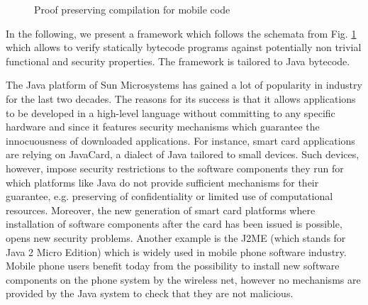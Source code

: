  

    \begin{figure}[ht!]
\begin{center}
\caption{\sc Proof preserving compilation for mobile code}
\label{intro:PPO}
\end{center}
\end{figure}


In the following, we present a framework which follows the schemata from Fig. \ref{intro:PPO}  which allows to verify statically bytecode programs 
against potentially non trivial functional and security properties. The framework is tailored to Java bytecode.

  The Java platform  of Sun Microsystems has gained a lot of popularity in industry  for the last two decades.
 The reasons for its  success is that it allows applications to 
 be developed in a high-level language without committing to any
 specific hardware and since it features security mechanisms which
 guarantee the innocuousness of downloaded applications.  
 For instance, smart card applications are relying  on JavaCard, a dialect of Java tailored to small devices.
 Such devices, however, impose  security restrictions  to the software components  they run for which platforms like Java do not provide 
 sufficient mechanisms for their guarantee, e.g. preserving of confidentiality or limited use of computational resources. Moreover,
 the new generation of smart card platforms where installation of  software components after the card has been issued is possible, opens new security problems.
 Another example is the J2ME (which stands for Java 2 Micro Edition) which is widely used in mobile phone software industry.
 Mobile phone users benefit today from the possibility to install new software components on the phone system by the wireless net, 
 however no mechanisms are provided by the Java system to check that they are not malicious.


